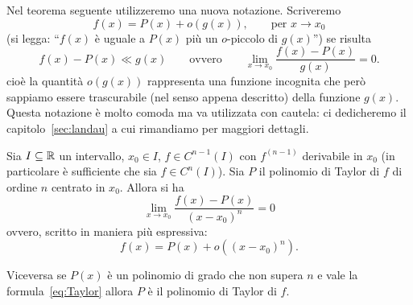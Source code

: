 Nel teorema seguente utilizzeremo una nuova notazione. Scriveremo
\[
  f(x) = P(x) + o(g(x)), \qquad \text{per $x\to x_0$}
\]
(si legga: ``$f(x)$ è uguale a $P(x)$ più un $o$-piccolo di $g(x)$'')
se risulta
\[
  f(x) - P(x) \ll g(x)
  \qquad\text{ovvero}\qquad
  \lim_{x\to x_0} \frac{f(x)-P(x)}{g(x)} = 0.
\]
cioè la quantità $o(g(x))$ rappresenta una funzione incognita
che però sappiamo essere trascurabile (nel senso appena descritto)
della funzione $g(x)$.
Questa notazione è molto comoda ma va utilizzata con cautela:
ci dedicheremo il capitolo~\ref{sec:landau} a cui rimandiamo
per maggiori dettagli.

\begin{theorem}
\label{th:taylor_peano}
\mymark{***}%
Sia $I\subseteq \mathbb R$ un intervallo, $x_0\in I$, $f\in C^{n-1}(I)$ con $f^{(n-1)}$
derivabile in $x_0$
(in particolare è sufficiente che sia $f\in C^n(I)$).
Sia $P$ il polinomio di Taylor di $f$ di ordine $n$ centrato in $x_0$. Allora si ha
\begin{equation}\label{eq:taylor_peano}
  \lim_{x\to x_0}\frac{f(x) - P(x)}{(x-x_0)^n} = 0
\end{equation}
ovvero, scritto in maniera più espressiva:
\begin{equation}\label{eq:Taylor}
  f(x) = P(x) + o((x-x_0)^n).
\end{equation}

Viceversa se $P(x)$ è un polinomio di grado che non supera $n$ e vale la
formula~\eqref{eq:Taylor} allora $P$ è il polinomio di Taylor di $f$.
\end{theorem}
%
